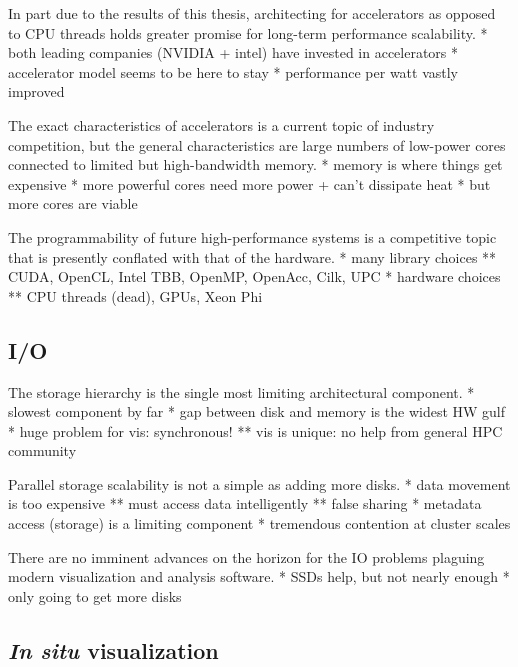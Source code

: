 In part due to the results of this thesis, architecting for
accelerators as opposed to CPU threads holds greater promise for
long-term performance scalability.
	* both leading companies (NVIDIA + intel) have invested in accelerators
	* accelerator model seems to be here to stay
	* performance per watt vastly improved

The exact characteristics of accelerators is a current topic of
industry competition, but the general characteristics are large numbers
of low-power cores connected to limited but high-bandwidth memory.
	* memory is where things get expensive
	* more powerful cores need more power + can't dissipate heat
	* but more cores are viable

The programmability of future high-performance systems is a competitive
topic that is presently conflated with that of the hardware.
	* many library choices
	** CUDA, OpenCL, Intel TBB, OpenMP, OpenAcc, Cilk, UPC
	* hardware choices
	** CPU threads (dead), GPUs, Xeon Phi


\subsection{I/O}

The storage hierarchy is the single most limiting architectural
component.
	* slowest component by far
	* gap between disk and memory is the widest HW gulf
	* huge problem for vis: synchronous!
	** vis is unique: no help from general HPC community

Parallel storage scalability is not a simple as adding more disks.
	* data movement is too expensive
	** must access data intelligently
	** false sharing
	* metadata access (storage) is a limiting component
	* tremendous contention at cluster scales


There are no imminent advances on the horizon for the IO problems
plaguing modern visualization and analysis software.
	* SSDs help, but not nearly enough
	* only going to get more disks

\subsection{\textit{In situ} visualization}

